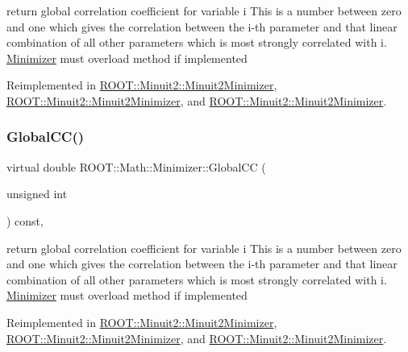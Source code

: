 return global correlation coefficient for variable i This is a number between zero and one which gives the correlation between the i-\/th parameter and that linear combination of all other parameters which is most strongly correlated with i. \mbox{\hyperlink{classROOT_1_1Math_1_1Minimizer}{Minimizer}} must overload method if implemented 

Reimplemented in \mbox{\hyperlink{classROOT_1_1Minuit2_1_1Minuit2Minimizer_adde21edb0a67e0eef950049528cfb9a7}{R\+O\+O\+T\+::\+Minuit2\+::\+Minuit2\+Minimizer}}, \mbox{\hyperlink{classROOT_1_1Minuit2_1_1Minuit2Minimizer_adde21edb0a67e0eef950049528cfb9a7}{R\+O\+O\+T\+::\+Minuit2\+::\+Minuit2\+Minimizer}}, and \mbox{\hyperlink{classROOT_1_1Minuit2_1_1Minuit2Minimizer_adde21edb0a67e0eef950049528cfb9a7}{R\+O\+O\+T\+::\+Minuit2\+::\+Minuit2\+Minimizer}}.

\mbox{\label{classROOT_1_1Math_1_1Minimizer_a6b50b0b0ccb0cb23da281ef978d145c5}} 
\subsubsection{\texorpdfstring{GlobalCC()}{GlobalCC()}\hspace{0.1cm}{\footnotesize\ttfamily [3/3]}}
{\footnotesize\ttfamily virtual double R\+O\+O\+T\+::\+Math\+::\+Minimizer\+::\+Global\+CC (\begin{DoxyParamCaption}\item[{unsigned int}]{ }\end{DoxyParamCaption}) const\hspace{0.3cm}{\ttfamily [inline]}, {\ttfamily [virtual]}}

return global correlation coefficient for variable i This is a number between zero and one which gives the correlation between the i-\/th parameter and that linear combination of all other parameters which is most strongly correlated with i. \mbox{\hyperlink{classROOT_1_1Math_1_1Minimizer}{Minimizer}} must overload method if implemented 

Reimplemented in \mbox{\hyperlink{classROOT_1_1Minuit2_1_1Minuit2Minimizer_adde21edb0a67e0eef950049528cfb9a7}{R\+O\+O\+T\+::\+Minuit2\+::\+Minuit2\+Minimizer}}, \mbox{\hyperlink{classROOT_1_1Minuit2_1_1Minuit2Minimizer_adde21edb0a67e0eef950049528cfb9a7}{R\+O\+O\+T\+::\+Minuit2\+::\+Minuit2\+Minimizer}}, and \mbox{\hyperlink{classROOT_1_1Minuit2_1_1Minuit2Minimizer_adde21edb0a67e0eef950049528cfb9a7}{R\+O\+O\+T\+::\+Minuit2\+::\+Minuit2\+Minimizer}}.

